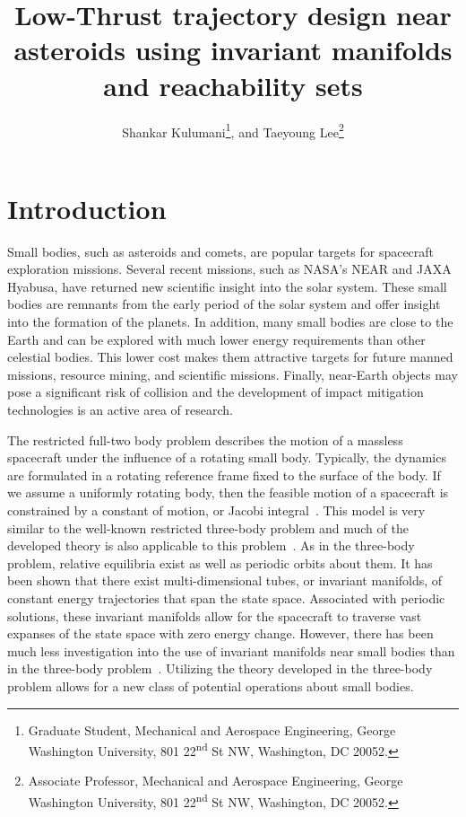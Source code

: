 \documentclass[letterpaper, preprint, paper,11pt]{AAS}	%
\begin{document}
\title{Low-Thrust trajectory design near asteroids using invariant manifolds and reachability sets}

\author{Shankar Kulumani\thanks{Graduate Student, Mechanical and Aerospace Engineering, George Washington University, 801 22\textsuperscript{nd} St NW, Washington, DC 20052.}, and  
Taeyoung Lee\thanks{Associate Professor, Mechanical and Aerospace Engineering, George Washington University, 801 22\textsuperscript{nd} St NW, Washington, DC 20052.}
}


\maketitle{} 		


\section{Introduction}

Small bodies, such as asteroids and comets, are popular targets for spacecraft exploration missions.
Several recent missions, such as NASA's NEAR and JAXA Hyabusa, have returned new scientific insight into the solar system. 
These small bodies are remnants from the early period of the solar system and offer insight into the formation of the planets.
In addition, many small bodies are close to the Earth and can be explored with much lower energy requirements than other celestial bodies.
This lower cost makes them attractive targets for future manned missions, resource mining, and scientific missions.
Finally, near-Earth objects may pose a significant risk of collision and the development of impact mitigation technologies is an active area of research.
 
The restricted full-two body problem describes the motion of a massless spacecraft under the influence of a rotating small body.
Typically, the dynamics are formulated in a rotating reference frame fixed to the surface of the body.
If we assume a uniformly rotating body, then the feasible motion of a spacecraft is constrained by a constant of motion, or Jacobi integral~\cite{scheeres1994,scheeres2012}.
This model is very similar to the well-known restricted three-body problem and much of the developed theory is also applicable to this problem~\cite{koon2011,ross2006}.
As in the three-body problem, relative equilibria exist as well as periodic orbits about them.
It has been shown that there exist multi-dimensional tubes, or invariant manifolds, of constant energy trajectories that span the state space. 
Associated with periodic solutions, these invariant manifolds allow for the spacecraft to traverse vast expanses of the state space with zero energy change. 
However, there has been much less investigation into the use of invariant manifolds near small bodies than in the three-body problem~\cite{herrera2014,mondelo2010}.
Utilizing the theory developed in the three-body problem allows for a new class of potential operations about small bodies.
\end{document}
